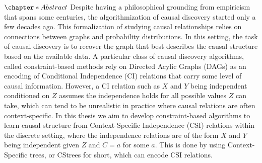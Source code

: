 \documentclass{tufte-book}
\author{nazaal}
\date{\today}
\title{}
\begin{document}
\setlength\parindent{0pt}
\setcounter{secnumdepth}{2}
\newcommand{\indep}{\perp \!\!\! \perp}

\let\cleardoublepage\clearpage

\(\chapter*{Abstract}\)
Despite having a philosophical grounding from empiricism that spans some centuries, the algorithmization of causal discovery started only a few decades ago. This formalization of studying causal relationships relies on connections between graphs and probability distributions. In this setting, the task of causal discovery is to recover the graph that best describes the causal structure based on the available data. A particular class of causal discovery algorithms, called constraint-based methods rely on Directed Acylic Graphs (DAGs) as an encoding of Conditional Independence (CI) relations that carry some level of causal information. However, a CI relation such as \(X\) and \(Y\) being independent conditioned on \(Z\) assumes the independence holds for all possible values \(Z\) can take, which can tend to be unrealistic in practice where causal relations are often context-specific.  In this thesis we aim to develop constraint-based algorithms to learn causal structure from Context-Specific Independence (CSI) relations within the discrete setting, where the independence relations are of the form \(X\) and \(Y\) being independent given \(Z\) and \(C=a\) for some \(a\). This is done by using Context-Specific trees, or CStrees for short, which can encode CSI relations. 
\end{document}
